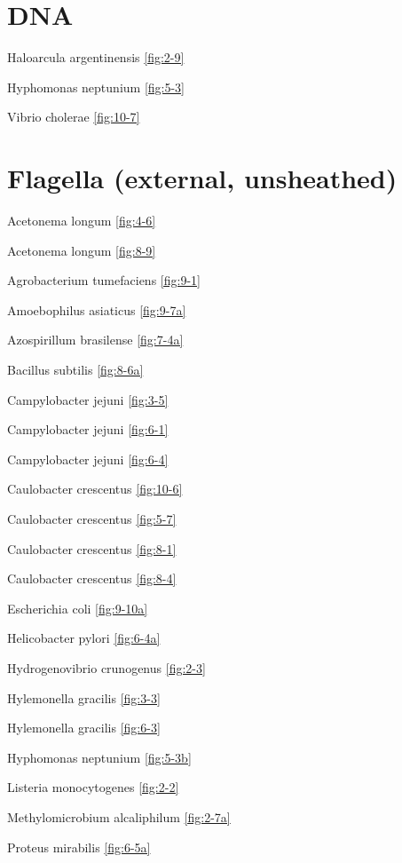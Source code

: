 \documentclass[]{tufte-book}
\begin{document}
\hypertarget{dna-1}{%
\section*{DNA}\label{dna-1}}

Haloarcula argentinensis \ref{fig:2-9}

Hyphomonas neptunium \ref{fig:5-3}

Vibrio cholerae \ref{fig:10-7}

\hypertarget{flagella-external-unsheathed}{%
\section*{Flagella (external, unsheathed)}\label{flagella-external-unsheathed}}

Acetonema longum \ref{fig:4-6}

Acetonema longum \ref{fig:8-9}

Agrobacterium tumefaciens \ref{fig:9-1}

Amoebophilus asiaticus \ref{fig:9-7a}

Azospirillum brasilense \ref{fig:7-4a}

Bacillus subtilis \ref{fig:8-6a}

Campylobacter jejuni \ref{fig:3-5}

Campylobacter jejuni \ref{fig:6-1}

Campylobacter jejuni \ref{fig:6-4}

Caulobacter crescentus \ref{fig:10-6}

Caulobacter crescentus \ref{fig:5-7}

Caulobacter crescentus \ref{fig:8-1}

Caulobacter crescentus \ref{fig:8-4}

Escherichia coli \ref{fig:9-10a}

Helicobacter pylori \ref{fig:6-4a}

Hydrogenovibrio crunogenus \ref{fig:2-3}

Hylemonella gracilis \ref{fig:3-3}

Hylemonella gracilis \ref{fig:6-3}

Hyphomonas neptunium \ref{fig:5-3b}

Listeria monocytogenes \ref{fig:2-2}

Methylomicrobium alcaliphilum \ref{fig:2-7a}

Proteus mirabilis \ref{fig:6-5a}
\end{document}
